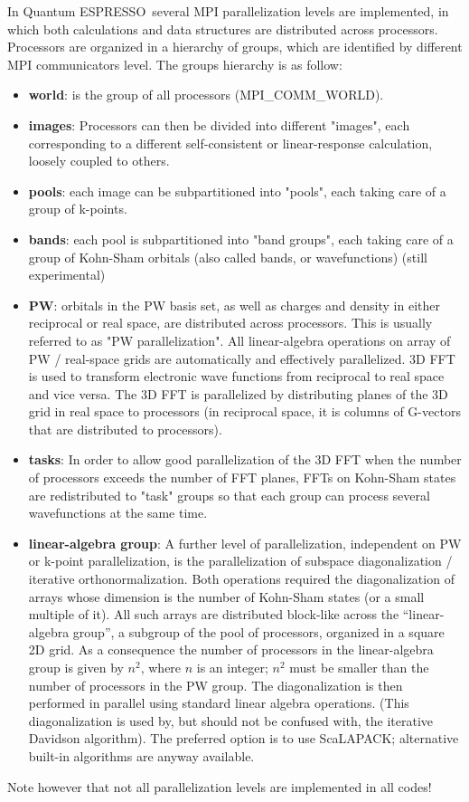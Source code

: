 \documentclass[12pt,a4paper]{article}
\def\qe{{\sc Quantum ESPRESSO}}
\begin{document}
In \qe\ several MPI parallelization levels are 
implemented, in which both calculations
and data structures are distributed across processors.
Processors are organized in a hierarchy of groups, 
which are identified by different MPI communicators level.
The groups hierarchy is as follow:
\begin{itemize}
\item {\bf world}: is the group of all processors (MPI\_COMM\_WORLD).
\item 
{\bf images}: Processors can then be divided into different "images", each corresponding to a
different self-consistent or linear-response
calculation, loosely coupled to others.
\item
{\bf pools}: each image can be subpartitioned into
"pools", each taking care of a group of k-points.
\item
{\bf bands}: each pool is subpartitioned into
"band groups", each taking care of a group
of Kohn-Sham orbitals (also called bands, or
wavefunctions) (still experimental)
\item
{\bf PW}: orbitals in the PW basis set,
as well as charges and density in either 
reciprocal or real space, are distributed
across processors.
This is usually referred to as "PW parallelization".
All linear-algebra operations on array of  PW / 
real-space grids are automatically and effectively parallelized.
3D FFT is used to transform electronic wave functions from
reciprocal to real space and vice versa. The 3D FFT is
parallelized by distributing planes of the 3D grid in real
space to processors (in reciprocal space, it is columns of
G-vectors that are distributed to processors). 
\item
{\bf tasks}: 
In order to allow good parallelization of the 3D FFT when 
the number of processors exceeds the number of FFT planes,
FFTs on Kohn-Sham states are redistributed to 
"task" groups so that each group 
can process several wavefunctions at the same time.
\item
{\bf linear-algebra group}:
A further level of parallelization, independent on
PW or k-point parallelization, is the parallelization of
subspace diagonalization / iterative orthonormalization.
 Both operations required the diagonalization of 
arrays whose dimension is the number of Kohn-Sham states
(or a small multiple of it). All such arrays are distributed block-like
across the ``linear-algebra group'', a subgroup of the pool of processors,
organized in a square 2D grid. As a consequence the number of processors
in the linear-algebra group is given by $n^2$, where $n$ is an integer;
$n^2$ must be smaller than the number of processors in the PW group.
The diagonalization is then performed
in parallel using standard linear algebra operations.
(This diagonalization is used by, but should not be confused with,
the iterative Davidson algorithm). The preferred option is to use
ScaLAPACK; alternative built-in algorithms are anyway available.
\end{itemize}
Note however that not all parallelization levels 
are implemented in all codes! 
\end{document}
